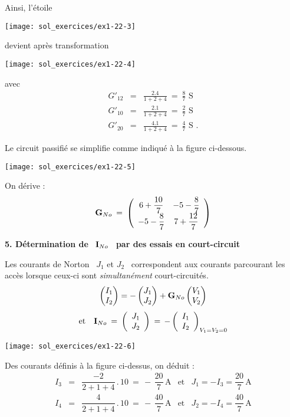Ainsi, l'étoile
\begin{center}
	\texttt{[image: sol\_exercices/ex1-22-3]}
\end{center}
devient après transformation

\parbox[c]{5cm}{
\begin{center}
\texttt{[image: sol\_exercices/ex1-22-4]}
\end{center}}
\parbox[c]{5cm}{
avec 
\begin{eqnarray*}
	G'_{12} &=& \frac{2.4}{1+2+4} \: = \: \frac{8}{7}\, \,\text{S}\\
	G'_{10} &=& \frac{2.1}{1+2+4} \: = \: \frac{2}{7}\, \,\text{S}\\
	G'_{20} &=& \frac{4.1}{1+2+4} \: = \: \frac{4}{7}\, \,\text{S~.}
\end{eqnarray*}}

Le circuit passifié se simplifie comme indiqué à la figure ci-dessous.
\begin{center}
	\texttt{[image: sol\_exercices/ex1-22-5]}
\end{center}

On dérive : 
\[ {\bf G}_{No} \: = \: \left( \begin{array}{cc}
6+\dfrac{10}{7} & -5 - \dfrac{8}{7}\\
-5 - \dfrac{8}{7} & 7 + \dfrac{12}{7} \end{array} \right) \]

{\bf 5. Détermination de} \ ${\bf I}_{No}$ \ {\bf par des essais en court-circuit}

Les courants de Norton \ $J_1$ et $J_2$ \ correspondent aux courants
parcourant les accès lorsque ceux-ci sont {\em simultanément}
court-circuités.
\[
\begin{pmatrix}
I_1\\I_2
\end{pmatrix} = -
\begin{pmatrix}
J_1\\J_2
\end{pmatrix} + {\bf G}_{No}
\begin{pmatrix}
V_1\\V_2
\end{pmatrix}\]
\[ \mbox{et~~~}{\bf I}_{No} \: = \: \left( \begin{array}{c} J_1 \\ J_2 \end{array} \right) 
\: = \, -  \left( \begin{array}{c} I_1 \\ I_2 \end{array} \right)_{V_1=V_2=0} \] 
\begin{center}
	\texttt{[image: sol\_exercices/ex1-22-6]}
\end{center}
Des courants définis à la figure ci-dessus, on déduit :
\[ \begin{array}{rclcl}
I_3 &=& \dfrac{-2}{2+1+4} \, . \, 10 \: = \, -\, \dfrac{20}{7}\, \text{A} & 
\mbox{et} & J_1 = -I_3 = \dfrac{20}{7}\, \text{A} \\
I_4 &=& \dfrac{4}{2+1+4} \, . \, 10 \: = \, -\, \dfrac{40}{7}\, \text{A} & 
\mbox{et} & J_2 = -I_4 = \dfrac{40}{7}\, \text{A} 
\end{array} \]
		
